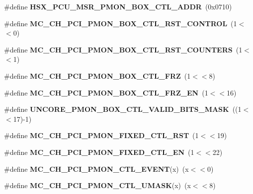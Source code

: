 \begin{DoxyCompactItemize}
\item 
\#define {\bfseries H\+S\+X\+\_\+\+P\+C\+U\+\_\+\+M\+S\+R\+\_\+\+P\+M\+O\+N\+\_\+\+B\+O\+X\+\_\+\+C\+T\+L\+\_\+\+A\+D\+D\+R}~(0x0710)\label{types_8h_a9c0e92fd4e80ecf71b5872a577e7cab3}

\item 
\#define {\bfseries M\+C\+\_\+\+C\+H\+\_\+\+P\+C\+I\+\_\+\+P\+M\+O\+N\+\_\+\+B\+O\+X\+\_\+\+C\+T\+L\+\_\+\+R\+S\+T\+\_\+\+C\+O\+N\+T\+R\+O\+L}~(1$<$$<$0)\label{types_8h_a65cac0a218f19cd43f965cee10f8f9b7}

\item 
\#define {\bfseries M\+C\+\_\+\+C\+H\+\_\+\+P\+C\+I\+\_\+\+P\+M\+O\+N\+\_\+\+B\+O\+X\+\_\+\+C\+T\+L\+\_\+\+R\+S\+T\+\_\+\+C\+O\+U\+N\+T\+E\+R\+S}~(1$<$$<$1)\label{types_8h_abe2e9ee35901cb368d216c1930395fe2}

\item 
\#define {\bfseries M\+C\+\_\+\+C\+H\+\_\+\+P\+C\+I\+\_\+\+P\+M\+O\+N\+\_\+\+B\+O\+X\+\_\+\+C\+T\+L\+\_\+\+F\+R\+Z}~(1$<$$<$8)\label{types_8h_a2d4b33ec94e8fe5aa98725bfc7f6a094}

\item 
\#define {\bfseries M\+C\+\_\+\+C\+H\+\_\+\+P\+C\+I\+\_\+\+P\+M\+O\+N\+\_\+\+B\+O\+X\+\_\+\+C\+T\+L\+\_\+\+F\+R\+Z\+\_\+\+E\+N}~(1$<$$<$16)\label{types_8h_aa2aaad26e22dcd5bf0f5af5b1df2f83b}

\item 
\#define {\bfseries U\+N\+C\+O\+R\+E\+\_\+\+P\+M\+O\+N\+\_\+\+B\+O\+X\+\_\+\+C\+T\+L\+\_\+\+V\+A\+L\+I\+D\+\_\+\+B\+I\+T\+S\+\_\+\+M\+A\+S\+K}~((1$<$$<$17)-\/1)\label{types_8h_a6cb428bc4605cf2a315ca40251a1215b}

\item 
\#define {\bfseries M\+C\+\_\+\+C\+H\+\_\+\+P\+C\+I\+\_\+\+P\+M\+O\+N\+\_\+\+F\+I\+X\+E\+D\+\_\+\+C\+T\+L\+\_\+\+R\+S\+T}~(1$<$$<$19)\label{types_8h_a7d8d0f63d5190fc4c196e723611e8790}

\item 
\#define {\bfseries M\+C\+\_\+\+C\+H\+\_\+\+P\+C\+I\+\_\+\+P\+M\+O\+N\+\_\+\+F\+I\+X\+E\+D\+\_\+\+C\+T\+L\+\_\+\+E\+N}~(1$<$$<$22)\label{types_8h_ae84422faffd5e02c7bda77fb3c26ad22}

\item 
\#define {\bfseries M\+C\+\_\+\+C\+H\+\_\+\+P\+C\+I\+\_\+\+P\+M\+O\+N\+\_\+\+C\+T\+L\+\_\+\+E\+V\+E\+N\+T}(x)~(x$<$$<$0)\label{types_8h_a97155caecb2f1f1f353e205519c887de}

\item 
\#define {\bfseries M\+C\+\_\+\+C\+H\+\_\+\+P\+C\+I\+\_\+\+P\+M\+O\+N\+\_\+\+C\+T\+L\+\_\+\+U\+M\+A\+S\+K}(x)~(x$<$$<$8)\label{types_8h_af9a380752ec95177a22919f6acea5c24}


\end{DoxyCompactItemize}

